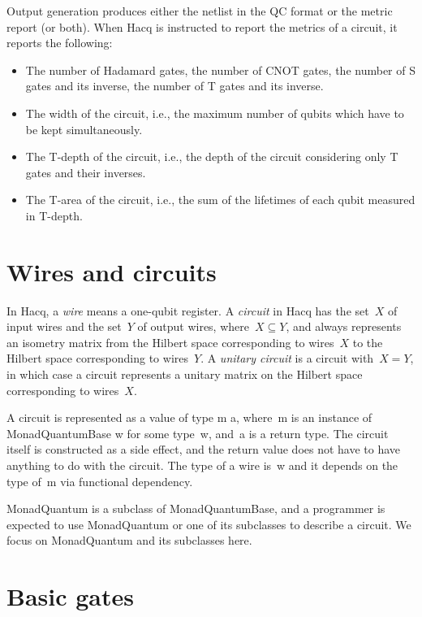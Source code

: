 \documentclass[11pt]{article}
\begin{document}
Output generation produces either the netlist in the QC format
or the metric report (or both).
When Hacq is instructed to report the metrics of a circuit, it reports the following:
\begin{itemize}
\item The number of Hadamard gates, the number of CNOT gates,
  the number of S gates and its inverse, the number of T gates and its inverse.
\item The width of the circuit, i.e., the maximum number of qubits which have to be kept simultaneously.
\item The T-depth of the circuit, i.e., the depth of the circuit considering only T gates and their inverses.
\item The T-area of the circuit, i.e., the sum of the lifetimes of each qubit measured in T-depth.
\end{itemize}

\section{Wires and circuits}

In Hacq, a \emph{wire} means a one-qubit register.
A \emph{circuit} in Hacq has the set~$X$ of input wires
and the set~$Y$ of output wires, where~$X\subseteq Y$,
and always represents an isometry matrix
from the Hilbert space corresponding to wires~$X$
to the Hilbert space corresponding to wires~$Y$.
A \emph{unitary circuit} is a circuit with~$X=Y$,
in which case a circuit represents a unitary matrix
on the Hilbert space corresponding to wires~$X$.

A circuit is represented as a value of type \textsf{m a},
where~\textsf{m} is an instance of \textsf{MonadQuantumBase w} for some type~\textsf{w},
and~\textsf{a} is a return type.
The circuit itself is constructed as a side effect,
and the return value does not have to have anything to do with the circuit.
The type of a wire is~\textsf{w}
and it depends on the type of~\textsf{m} via functional dependency.

\textsf{MonadQuantum} is a subclass of \textsf{MonadQuantumBase},
and a programmer is expected to use \textsf{MonadQuantum} or one of its subclasses
to describe a circuit.
We focus on \textsf{MonadQuantum} and its subclasses here.

\section{Basic gates}
\end{document}
